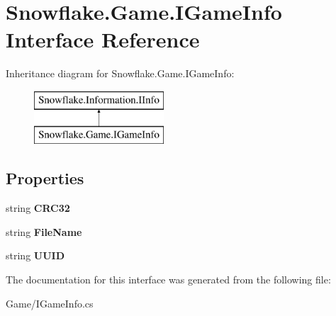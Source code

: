 \hypertarget{interface_snowflake_1_1_game_1_1_i_game_info}{}\section{Snowflake.\+Game.\+I\+Game\+Info Interface Reference}
\label{interface_snowflake_1_1_game_1_1_i_game_info}
Inheritance diagram for Snowflake.\+Game.\+I\+Game\+Info\+:\begin{figure}[H]
\begin{center}
\leavevmode
\includegraphics[height=2.000000cm]{interface_snowflake_1_1_game_1_1_i_game_info}
\end{center}
\end{figure}
\subsection*{Properties}
\begin{DoxyCompactItemize}
\item 
\hypertarget{interface_snowflake_1_1_game_1_1_i_game_info_a9a22682d66d9686ff4d64e83eb961624}{}string {\bfseries C\+R\+C32}\label{interface_snowflake_1_1_game_1_1_i_game_info_a9a22682d66d9686ff4d64e83eb961624}

\item 
\hypertarget{interface_snowflake_1_1_game_1_1_i_game_info_a9d47fb0690eb47f4bdf2e0e60afc4555}{}string {\bfseries File\+Name}\label{interface_snowflake_1_1_game_1_1_i_game_info_a9d47fb0690eb47f4bdf2e0e60afc4555}

\item 
\hypertarget{interface_snowflake_1_1_game_1_1_i_game_info_ad1ce0e9aece31e7b1f38f867177e7bee}{}string {\bfseries U\+U\+I\+D}\label{interface_snowflake_1_1_game_1_1_i_game_info_ad1ce0e9aece31e7b1f38f867177e7bee}

\end{DoxyCompactItemize}


The documentation for this interface was generated from the following file\+:\begin{DoxyCompactItemize}
\item 
Game/I\+Game\+Info.\+cs\end{DoxyCompactItemize}
